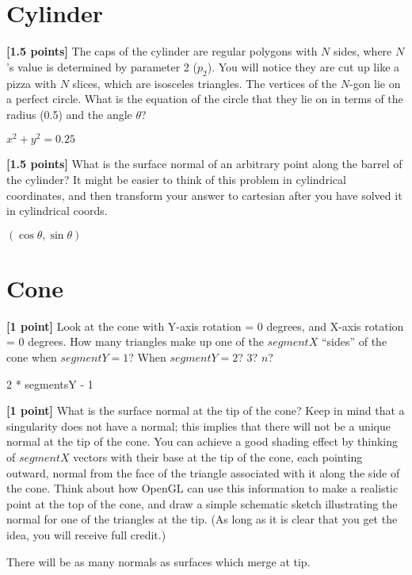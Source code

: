 \documentclass[10pt,twocolumn]{article}
\begin{document}
\section{Cylinder}
{\bf [1.5 points]} The caps of the cylinder are regular polygons with $N$ sides, where $N$'s value is determined by parameter 2 ($p_2$). You will notice they are cut up like a pizza with $N$ slices, which are isosceles triangles. The vertices of the $N$-gon lie on a perfect circle. What is the equation of the circle that they lie on  in terms of the radius (0.5) and the angle $\theta$?
\begin{framed}
$x^2 +y^2 = 0.25$
\vspace{6em}
\end{framed}

{\bf [1.5 points]} What is the surface normal of an arbitrary point along the barrel of the cylinder? It might be easier to think of this problem in cylindrical coordinates, and then transform your answer to cartesian after you have solved it in cylindrical coords.
\begin{framed}
$(\cos \theta, \sin \theta)$
\vspace{6em}
\end{framed}


\section{Cone}
{\bf [1 point]} Look at the cone with Y-axis rotation = 0 degrees, and X-axis rotation = 0 degrees. How many triangles make up one of the $segmentX$ ``sides'' of the cone when $segmentY=1$? When $segmentY=2$? 3? $n$?
\begin{framed}
2 * segmentsY - 1
\vspace{10em}
\end{framed}

{\bf [1 point]} What is the surface normal at the tip of the cone? Keep in mind that a singularity does not have a normal; this implies that there will not be a unique normal at the tip of the cone. You can achieve a good shading effect by thinking of $segmentX$ vectors with their base at the tip of the cone, each pointing outward, normal from the face of the triangle associated with it along the side of the cone. Think about how OpenGL can use this information to make a realistic point at the top of the cone, and draw a simple schematic sketch illustrating the normal for one of the triangles at the tip. (As long as it is clear that you get the idea, you will receive full credit.)
\begin{framed}
There will be as many normals as surfaces which merge at tip.
\vspace{8em}
\end{framed}
\end{document}
